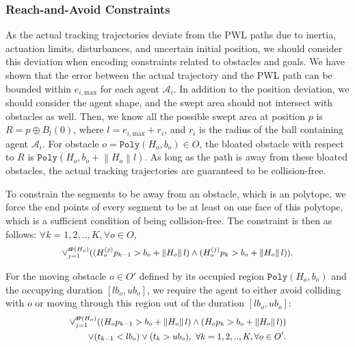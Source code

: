\documentclass[letterpaper]{article} %
\theoremstyle{definition}
\newcommand{\norm}[1]{\left\lVert#1\right\rVert}
\begin{document}
\subsubsection{Reach-and-Avoid Constraints}

As the actual tracking trajectories deviate from the PWL paths due to inertia, actuation limits, disturbances, and uncertain initial position, we should consider this deviation when encoding constraints related to obstacles and goals.  We have shown that the error between the actual trajectory and the PWL path can be bounded within $e_{i, \text{max}}$ for each agent $\mathcal{A}_i$. In addition to the position deviation, we should consider the agent shape, and the swept area should not intersect with obstacles as well. Then, we know all the possible swept area at position $p$ is $R = p \oplus B_{l}(0)$, where $l = e_{i, \text{max}} + r_i$, and $r_i$ is the radius of the ball containing agent $\mathcal{A}_i$. For obstacle $o = \texttt{Poly}(H_o,b_o) \in O$, the bloated obstacle with respect to $R$ is $\texttt{Poly}(H_{o}, b_o + \norm{H_o}l)$. As long as the path is away from these bloated obstacles, the actual tracking trajectories are guaranteed to be collision-free.



To constrain the segments to be away from an obstacle, which is an polytope, we force the end points of every segment to be at least on one face of this polytope, which is a sufficient condition of being collision-free. The constraint is then as follows: $\forall k = 1,2,..,K, \forall o \in O$,
\begin{equation*}\small
  \begin{aligned}
  \lor_{j=1}^{\texttt{dP}(H_{o})} ((H_{o}^{(j)}p_{k-1} > b_{o}+ \norm{H_o}l)
  \land (H_{o}^{(j)}p_k > b_{o}+ \norm{H_o}l)).
  \end{aligned}
\end{equation*}

For the moving obstacle $o \in O'$ defined by its occupied region $\texttt{Poly}(H_{o}, b_{o})$ and the occupying duration $[lb_o, ub_o]$, we require the agent to either avoid colliding with $o$ or moving through this region out of the duration $[lb_o, ub_o]$:
\begin{equation*}\small
  \begin{aligned}
   \lor_{j=1}^{\texttt{dP}(H_{o})} ((H_{o}p_{k-1} > b_{o}+ \norm{H_o}l) 
  \land (H_{o}p_k > b_{o}+ \norm{H_o}l))\\
    \lor (t_{k-1} < lb_{o})
    \lor (t_k > ub_{o}), \ 
    \forall k = 1,2,..,K, \forall o \in O'.
  \end{aligned}
\end{equation*}
\end{document}
